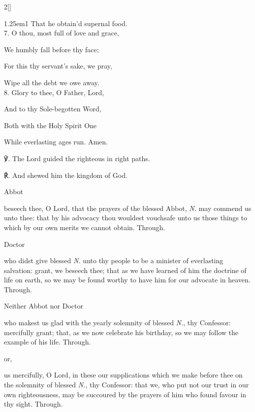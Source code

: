 \begin{paracol}{2}[]
\begin{hangparas}{1.25em}{1}
That he obtain'd supernal food.\\

7. O thou, most full of love and grace,

We humbly fall before thy face;

For this thy servant's sake, we pray,

Wipe all the debt we owe away.\\

8. Glory to thee, O Father, Lord,

And to thy Sole-begotten Word,

Both with the Holy Spirit One

While everlasting ages run. Amen.\\
\end{hangparas}

℣. The Lord guided the righteous in right paths.

℟. And shewed him the kingdom of God.


\fussy
\end{paracol}

\collect
\begin{inhead}\label{AbbotCollect}
	Abbot
\end{inhead}
 beseech thee, O Lord, that the prayers of the blessed Abbot, \textit{N.} may commend us unto thee: that by his advocacy thou wouldest vouchsafe unto us those things to which by our own merits we cannot obtain. Through.

\begin{inhead}\label{DoctorCollect}
	Doctor
\end{inhead}
 who didst give blessed \textit{N.} unto thy people to be a minister of everlasting salvation: grant, we beseech thee; that as we have learned of him the doctrine of life on earth, so we may be found worthy to have him for our advocate in heaven. Through.

\begin{inhead}\label{ConfessorNotBishopCollect}
	Neither Abbot nor Doctor
\end{inhead}
 who makest us glad with the yearly solemnity of blessed \textit{N.}, thy Confessor: mercifully grant; that, as we now celebrate his birthday, so we may follow the example of his life. Through.
\begin{inhead}
	or,
\end{inhead}
 us mercifully, O Lord, in these our supplications which we make before thee on the solemnity of blessed \textit{N.}, thy Confessor: that we, who put not our trust in our own righteousness, may be succoured by the prayers of him who found favour in thy sight. Through.


